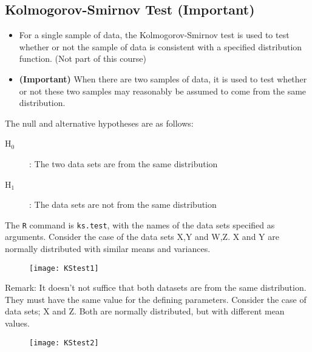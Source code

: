 \documentclass[12pt, a4paper]{report}
\theoremstyle{plain}
\theoremstyle{definition}
\theoremstyle{remark}
\begin{document}
\subsection*{Kolmogorov-Smirnov Test (Important)}
\begin{itemize}
\item For a single sample of data, the Kolmogorov-Smirnov test is used to test whether or not the sample
of data is consistent with a specified distribution function. (Not part of this course)
\item \textbf{(Important)} When there are two samples of data, it is used to test whether or not these two samples may
reasonably be assumed to come from the same distribution.
\end{itemize}

The null and alternative hypotheses are as follows:

\begin{description}
\item[H$_0$]: The two data sets are from the same distribution
\item[H$_1$]: The data sets are not from the same distribution
\end{description}


The \texttt{R} command is \texttt{ks.test}, with the names of the data sets specified as arguments. Consider the case
of the data sets X,Y and W,Z. 
X and Y are normally distributed with similar means and variances.
\begin{figure}[h!]
\centering
\texttt{[image: KStest1]}

\end{figure}

Remark: It doesn’t not suffice that both datasets are from the same distribution. They must have
the same value for the defining parameters. Consider the case of data sets; X and Z. Both are
normally distributed, but with different mean values.

\begin{figure}[h!]
\centering
\texttt{[image: KStest2]}
\end{figure}
\end{document}
